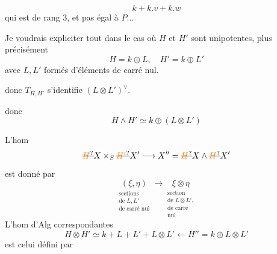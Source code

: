 \[
 k+k.v+k.w
\]
qui est de rang $3$, et pas égal à $P\ldots$

Je voudrais expliciter tout dans le cas où $H$ et $H'$ sont unipotentes, plus précisément
\[
 H=k\oplus L,\quad H'=k\oplus L'
\]
avec $L,L'$ formés d'éléments de carré nul.

donc  $T_{H,H'}$ s'identifie   $(L\otimes L')^\vee$.  

donc
\[
 H\wedge H'\simeq k\oplus(L\otimes L')
\]


L'hom
\[
 \deleted{\unsure{H}}X\times_S\deleted{\unsure{H'}}X'\longrightarrow X''=\deleted{\unsure{H}}X\wedge\deleted{\unsure{H}}X'
\]
est donné par
\[
 \underset{\substack{\text{sections}\\\text{de }L,L'\\\text{de carré nul}}}{(\xi,\eta)}
 \longrightarrow
 \underset{\substack{\text{section}\\\text{de }L\otimes L',\\\text{de carré}\\\text{nul}}}{\xi\otimes\eta}
\]
L'hom d'Alg correspondantes
\[
 H\otimes H'\simeq k+L+L'+L\otimes L'\longleftarrow H''=k\oplus L\otimes L'
\]
est celui défini par

